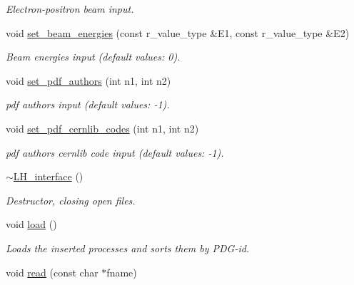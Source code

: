 \begin{DoxyCompactItemize}
\begin{DoxyCompactList}\small\item\em Electron-\/positron beam input. \end{DoxyCompactList}\item 
\hypertarget{a00326_a3e637e38356d8c83397d0301e7d98d30}{}void \hyperlink{a00326_a3e637e38356d8c83397d0301e7d98d30}{set\+\_\+beam\+\_\+energies} (const r\+\_\+value\+\_\+type \&E1, const r\+\_\+value\+\_\+type \&E2)\label{a00326_a3e637e38356d8c83397d0301e7d98d30}

\begin{DoxyCompactList}\small\item\em Beam energies input (default values\+: 0). \end{DoxyCompactList}\item 
\hypertarget{a00326_a3ea0390cb9cf9a577120a88a50487f32}{}void \hyperlink{a00326_a3ea0390cb9cf9a577120a88a50487f32}{set\+\_\+pdf\+\_\+authors} (int n1, int n2)\label{a00326_a3ea0390cb9cf9a577120a88a50487f32}

\begin{DoxyCompactList}\small\item\em pdf authors input (default values\+: -\/1). \end{DoxyCompactList}\item 
\hypertarget{a00326_a5f371b21240ffb0ea90a2d265dc15370}{}void \hyperlink{a00326_a5f371b21240ffb0ea90a2d265dc15370}{set\+\_\+pdf\+\_\+cernlib\+\_\+codes} (int n1, int n2)\label{a00326_a5f371b21240ffb0ea90a2d265dc15370}

\begin{DoxyCompactList}\small\item\em pdf authors cernlib code input (default values\+: -\/1). \end{DoxyCompactList}\item 
\hypertarget{a00326_ad54f6f0859e844f1c872def0d2ddfa1c}{}\hyperlink{a00326_ad54f6f0859e844f1c872def0d2ddfa1c}{$\sim$\+L\+H\+\_\+interface} ()\label{a00326_ad54f6f0859e844f1c872def0d2ddfa1c}

\begin{DoxyCompactList}\small\item\em Destructor, closing open files. \end{DoxyCompactList}\item 
\hypertarget{a00326_a07a634c0334ab3c2b61f212dc3f81bee}{}void \hyperlink{a00326_a07a634c0334ab3c2b61f212dc3f81bee}{load} ()\label{a00326_a07a634c0334ab3c2b61f212dc3f81bee}

\begin{DoxyCompactList}\small\item\em Loads the inserted processes and sorts them by P\+D\+G-\/id. \end{DoxyCompactList}\item 
\hypertarget{a00326_a47ab5ff8d75600e11b6117ce1da39079}{}void \hyperlink{a00326_a47ab5ff8d75600e11b6117ce1da39079}{read} (const char $\ast$fname)\label{a00326_a47ab5ff8d75600e11b6117ce1da39079}


\end{DoxyCompactItemize}
